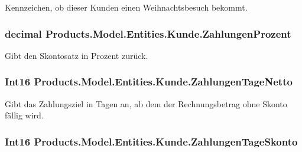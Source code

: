 Kennzeichen, ob dieser Kunden einen Weihnachtsbesuch bekommt. 

\subsubsection[{\texorpdfstring{Zahlungen\+Prozent}{ZahlungenProzent}}]{\setlength{\rightskip}{0pt plus 5cm}decimal Products.\+Model.\+Entities.\+Kunde.\+Zahlungen\+Prozent\hspace{0.3cm}{\ttfamily [get]}}\hypertarget{class_products_1_1_model_1_1_entities_1_1_kunde_a9685ac8f7149a67f90a8fafb9025639b}{}\label{class_products_1_1_model_1_1_entities_1_1_kunde_a9685ac8f7149a67f90a8fafb9025639b}


Gibt den Skontosatz in Prozent zurück. 

\subsubsection[{\texorpdfstring{Zahlungen\+Tage\+Netto}{ZahlungenTageNetto}}]{\setlength{\rightskip}{0pt plus 5cm}Int16 Products.\+Model.\+Entities.\+Kunde.\+Zahlungen\+Tage\+Netto\hspace{0.3cm}{\ttfamily [get]}}\hypertarget{class_products_1_1_model_1_1_entities_1_1_kunde_aeec796090567ee9294736d53c9f19f34}{}\label{class_products_1_1_model_1_1_entities_1_1_kunde_aeec796090567ee9294736d53c9f19f34}


Gibt das Zahlungsziel in Tagen an, ab dem der Rechnungsbetrag ohne Skonto fällig wird. 

\subsubsection[{\texorpdfstring{Zahlungen\+Tage\+Skonto}{ZahlungenTageSkonto}}]{\setlength{\rightskip}{0pt plus 5cm}Int16 Products.\+Model.\+Entities.\+Kunde.\+Zahlungen\+Tage\+Skonto\hspace{0.3cm}{\ttfamily [get]}}\hypertarget{class_products_1_1_model_1_1_entities_1_1_kunde_aba196825749ee4e75b675f2f0ad4abd6}{}\label{class_products_1_1_model_1_1_entities_1_1_kunde_aba196825749ee4e75b675f2f0ad4abd6}


